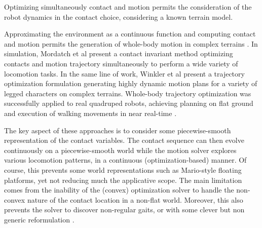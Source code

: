 Optimizing simultaneously contact and motion permits the consideration of the robot dynamics in the contact choice, considering a known terrain model.

Approximating the environment as a continuous function and computing contact and motion permits the generation of whole-body motion in complex terrains \cite{Dai_2014, posa2014}.
In simulation, Mordatch et al \cite{mordatch2012DiscCIopt} present a contact invariant method optimizing contacts and motion trajectory simultaneously to perform a wide variety of locomotion tasks.
In the same line of work, Winkler et al \cite{winkler2018GaitOpt} present a trajectory optimization formulation generating highly dynamic motion plans for a variety of legged characters on complex terrains.
Whole-body trajectory optimization was successfully applied to real quadruped robots, achieving planning on flat ground and execution of walking movements in near real-time \cite{Winkler2017_TO}.



The key aspect of these approaches is to consider some piecewise-smooth representation of the contact variables. The contact sequence can then evolve continuously on a piecewise-smooth world while the motion solver explores various locomotion patterns, in a continuous (optimization-based) manner. Of course, this prevents some world representations such as Mario-style floating platforms, yet not reducing much the applicative scope. 
The main limitation comes from the inability of the (convex) optimization solver to handle the non-convex nature of the contact location in a non-flat world. 
Moreover, this also prevents the solver to discover non-regular gaits, or with some clever but non generic reformulation \cite{winkler2018GaitOpt}.


